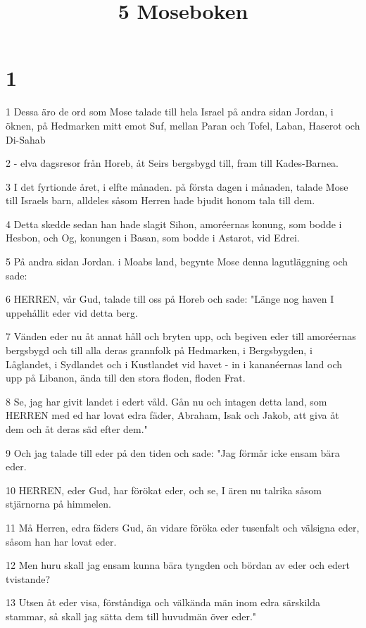 

\title{5 Moseboken}


\chapter{1}

\par 1 Dessa äro de ord som Mose talade till hela Israel på andra sidan Jordan, i öknen, på Hedmarken mitt emot Suf, mellan Paran och Tofel, Laban, Haserot och Di-Sahab
\par 2 - elva dagsresor från Horeb, åt Seirs bergsbygd till, fram till Kades-Barnea.
\par 3 I det fyrtionde året, i elfte månaden. på första dagen i månaden, talade Mose till Israels barn, alldeles såsom Herren hade bjudit honom tala till dem.
\par 4 Detta skedde sedan han hade slagit Sihon, amoréernas konung, som bodde i Hesbon, och Og, konungen i Basan, som bodde i Astarot, vid Edrei.
\par 5 På andra sidan Jordan. i Moabs land, begynte Mose denna lagutläggning och sade:
\par 6 HERREN, vår Gud, talade till oss på Horeb och sade: "Länge nog haven I uppehållit eder vid detta berg.
\par 7 Vänden eder nu åt annat håll och bryten upp, och begiven eder till amoréernas bergsbygd och till alla deras grannfolk på Hedmarken, i Bergsbygden, i Låglandet, i Sydlandet och i Kustlandet vid havet - in i kananéernas land och upp på Libanon, ända till den stora floden, floden Frat.
\par 8 Se, jag har givit landet i edert våld. Gån nu och intagen detta land, som HERREN med ed har lovat edra fäder, Abraham, Isak och Jakob, att giva åt dem och åt deras säd efter dem."
\par 9 Och jag talade till eder på den tiden och sade: "Jag förmår icke ensam bära eder.
\par 10 HERREN, eder Gud, har förökat eder, och se, I ären nu talrika såsom stjärnorna på himmelen.
\par 11 Må Herren, edra fäders Gud, än vidare föröka eder tusenfalt och välsigna eder, såsom han har lovat eder.
\par 12 Men huru skall jag ensam kunna bära tyngden och bördan av eder och edert tvistande?
\par 13 Utsen åt eder visa, förståndiga och välkända män inom edra särskilda stammar, så skall jag sätta dem till huvudmän över eder."
